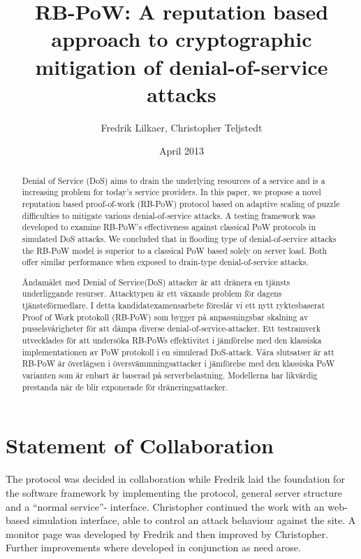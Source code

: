 \documentclass[a4paper,11pt]{kth-mag}
\title{RB-PoW: A reputation based approach to cryptographic mitigation of denial-of-service attacks}
\author{Fredrik Lilkaer, Christopher Teljstedt}
\date{April 2013}
\begin{document}
\removepagenumbers
\maketitle 
{}
\newpage

\begin{abstract}
Denial of Service (DoS) aims to drain the underlying resources of a service and is a increasing problem for today's service providers. In this paper, we propose a novel reputation based proof-of-work (RB-PoW)  protocol based on adaptive scaling of puzzle difficulties to mitigate various denial-of-service attacks. A testing framework was developed to examine RB-PoW's effectiveness against classical PoW protocols in simulated DoS attacks. We concluded that in flooding type of denial-of-service attacks the RB-PoW model is superior to a classical PoW based solely on server load. Both offer similar performance when exposed to drain-type denial-of-service attacks. 
\end{abstract} 
\newpage

\renewcommand*\abstractname{Referat}
\begin{abstract}
Ändamålet med Denial of Service(DoS) attacker är att dränera en tjänsts underliggande resurser. Attacktypen är ett växande problem för dagens tjänsteförmedlare. I detta kandidatexamensarbete föreslår vi ett nytt ryktesbaserat Proof of Work protokoll (RB-PoW) som bygger på anpassningsbar skalning av pusselsvårigheter för att dämpa diverse denial-of-service-attacker. Ett testramverk utvecklades för att undersöka RB-PoWs effektivitet i jämförelse med den klassiska implementationen av PoW protokoll i en simulerad DoS-attack. Våra slutsatser är att RB-PoW är överlägsen i översvämmningsattacker i jämförelse med den klassiska PoW varianten som är enbart är baserad på serverbelastning. Modellerna har likvärdig prestanda när de blir exponerade för dräneringsattacker.  
\end{abstract} 
\newpage
\section*{Statement of Collaboration} 
The protocol was decided in collaboration while Fredrik laid the foundation for the software framework by
implementing the protocol, general server structure and a ``normal service''- interface.
Christopher continued the work with an web-based simulation interface, able to control an attack behaviour against the site. A monitor page was developed by Fredrik and then improved by Christopher. Further improvements where developed in conjunction as need arose.
\end{document}
